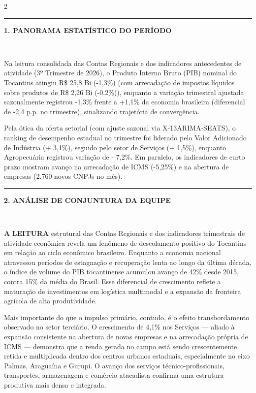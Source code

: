 \documentclass[10pt,a4paper]{article}
\newcommand{\secaoperiodico}[1]{%
  \vspace{4pt}%
  \noindent\colorbox{corfundo}{%
    \parbox{\dimexpr\columnwidth-2\fboxsep\relax}{%
      \vspace{3pt}%
      \textcolor{douradoto}{\rule{4pt}{9pt}}\hspace{6pt}%
      \textcolor{corprimaria}{\textbf{\small \MakeUppercase{#1}}}%
      \vspace{2pt}%
    }%
  }\\[-2pt]%
  \noindent{\color{corprimaria}\rule{\columnwidth}{1pt}}%
  \vspace{3pt}\par%
}
\begin{document}
\begin{multicols}{2}
\secaoperiodico{1. Panorama Estatístico do Período}

Na leitura consolidada das Contas Regionais e dos indicadores antecedentes de atividade (3º Trimestre de 2026), o Produto Interno Bruto (PIB) nominal do Tocantins atingiu R\$ 25,8 Bi (-1,3\%) (com arrecadação de impostos líquidos sobre produtos de R\$ 2,26 Bi (-0,2\%)), enquanto a variação trimestral ajustada sazonalmente registrou -1,3\% frente a +1,1\% da economia brasileira (diferencial de -2,4 p.p. no trimestre), sinalizando trajetória de convergência.

\vspace{4pt}

Pela ótica da oferta setorial (com ajuste sazonal via X-13ARIMA-SEATS), o ranking de desempenho estadual no trimestre foi liderado pelo Valor Adicionado de Indústria (+ 3,1\%), seguido pelo setor de Serviços (+ 1,5\%), enquanto Agropecuária registrou variação de - 7,2\%. Em paralelo, os indicadores de curto prazo mostram avanço na arrecadação de ICMS (-5,25\%) e na abertura de empresas (2.760 novos CNPJs no mês).

\secaoperiodico{2. Análise de Conjuntura da Equipe}

\lettrine[lines=2, lhang=0.05, nindent=3pt]{\textcolor{corprimaria}{\textbf{A}}}{\textbf{ LEITURA}} estrutural das Contas Regionais e dos indicadores trimestrais de atividade econômica revela um fenômeno de descolamento positivo do Tocantins em relação ao ciclo econômico brasileiro. Enquanto a economia nacional atravessou períodos de estagnação e recuperação lenta ao longo da última década, o índice de volume do PIB tocantinense acumulou avanço de 42\% desde 2015, contra 15\% da média do Brasil. Esse diferencial de crescimento reflete a maturação de investimentos em logística multimodal e a expansão da fronteira agrícola de alta produtividade.

\vspace{4pt}

Mais importante do que o impulso primário, contudo, é o efeito transbordamento observado no setor terciário. O crescimento de 4,1\% nos Serviços — aliado à expansão consistente na abertura de novas empresas e na arrecadação própria de ICMS — demonstra que a renda gerada no campo está sendo crescentemente retida e multiplicada dentro dos centros urbanos estaduais, especialmente no eixo Palmas, Araguaína e Gurupi. O avanço dos serviços técnico-profissionais, transportes, armazenagem e comércio atacadista confirma uma estrutura produtiva mais densa e integrada.


\end{multicols}
\end{document}
